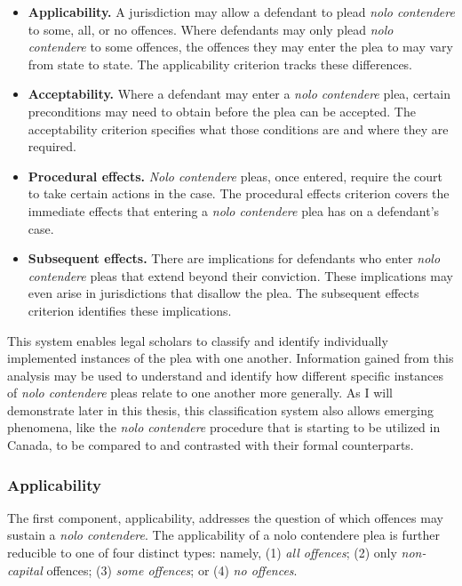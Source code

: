 \begin{itemize}
    \item \textbf{Applicability.} A jurisdiction may allow a defendant to plead \textit{nolo contendere} to some, all, or no offences. Where defendants may only plead \textit{nolo contendere} to some offences, the offences they may enter the plea to may vary from state to state. The applicability criterion tracks these differences.
    \item \textbf{Acceptability.} Where a defendant may enter a \textit{nolo contendere} plea, certain preconditions may need to obtain before the plea can be accepted. The acceptability criterion specifies what those conditions are and where they are required.
    \item \textbf{Procedural effects.} \textit{Nolo contendere} pleas, once entered, require the court to take certain actions in the case. The procedural effects criterion covers the immediate effects that entering a \textit{nolo contendere} plea has on a defendant's case.
    \item \textbf{Subsequent effects.} There are implications for defendants who enter \textit{nolo contendere} pleas that extend beyond their conviction. These implications may even arise in jurisdictions that disallow the plea. The subsequent effects criterion identifies these implications.
\end{itemize}

This system enables legal scholars to classify and identify individually implemented instances of the plea with one another. Information gained from this analysis may be used to understand and identify how different specific instances of \textit{nolo contendere} pleas relate to one another more generally. As I will demonstrate later in this thesis, this classification system also allows emerging phenomena, like the \textit{nolo contendere} procedure that is starting to be utilized in Canada, to be compared to and contrasted with their formal counterparts.

\subsubsection{Applicability}

The first component, applicability, addresses the question of which offences may sustain a \textit{nolo contendere}. The applicability of a nolo contendere plea is further reducible to one of four distinct types: namely, (1) \textit{all offences}; (2) only \textit{non-capital} offences; (3) \textit{some offences}; or (4) \textit{no offences}. 

